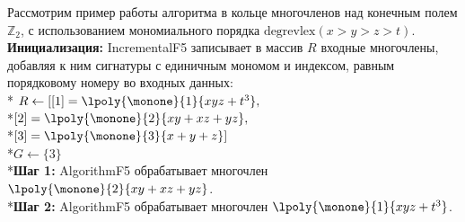 Рассмотрим пример работы алгоритма в кольце многочленов над конечным полем $\mathbb{Z}_{2}$, с использованием мономиального порядка $\mbox{degrevlex}(x>y>z>t)$. \textbf{Инициализация:} IncrementalF5 записывает в массив $R$ входные многочлены, добавляя к ним сигнатуры с единичным мономом и индексом, равным порядковому номеру во входных данных:\\* $R\leftarrow[ [1]=\lpoly{\monone}{1}{xyz+t^{3}},$\\*$[2]=\lpoly{\monone}{2}{xy+xz+yz},$\\*$[3]=\lpoly{\monone}{3}{x+y+z}]$\\*$G\leftarrow\{3\}$\\*\textbf{Шаг 1:} AlgorithmF5 обрабатывает многочлен $\lpoly{\monone}{2}{xy+xz+yz}$.\\*\textbf{Шаг 2:} AlgorithmF5 обрабатывает многочлен $\lpoly{\monone}{1}{xyz+t^{3}}$.